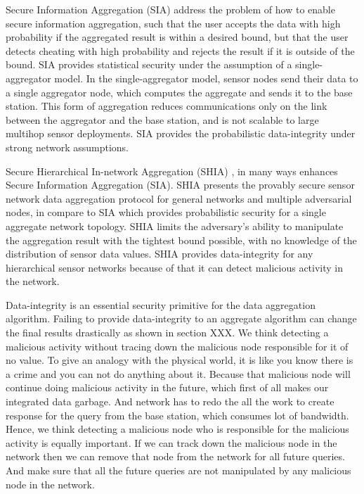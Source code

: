 	Secure Information Aggregation (SIA) \cite{przydatek2003sia}  address the problem of how to enable secure information aggregation, such that the user accepts the data with high probability if the aggregated result is within a desired bound, but that the user detects cheating with high probability and rejects the result if it is outside of the bound.
	SIA provides statistical security under the assumption of a single-aggregator model.
	In the single-aggregator model, sensor nodes send their data to a single
	aggregator node, which computes the aggregate and sends it to the
	base station.
	This form of aggregation reduces communications only on the link between the aggregator and the base station, and is not scalable to large multihop sensor deployments.
	SIA provides the probabilistic data-integrity under strong network assumptions.

	Secure Hierarchical In-network Aggregation (SHIA) \cite{chan2006secure}, in many ways enhances Secure Information Aggregation (SIA).
	SHIA presents the provably secure sensor network data aggregation protocol for general networks and multiple adversarial nodes, in compare to SIA which provides probabilistic security for a single aggregate network topology.
	SHIA limits the adversary’s ability to manipulate the aggregation result with the tightest bound possible, with no knowledge of the distribution of sensor data values.
	SHIA provides data-integrity for any hierarchical sensor networks because of that it can detect malicious activity in the network.

	Data-integrity is an essential security primitive for the data aggregation algorithm.
	Failing to provide data-integrity to an aggregate algorithm can change the final results drastically as shown in section XXX.
	We think detecting a malicious activity without tracing down the malicious node responsible for it of no value.
	To give an analogy with the physical world, it is like you know there is a crime and you can not do anything about it.
	Because that malicious node will continue doing malicious activity in the future, which first of all makes our integrated data garbage. 
	And network has to redo the all the work to create response for the query from the base station, which consumes lot of bandwidth. 
	Hence, we think detecting a malicious node who is responsible for the malicious activity is equally important.
	If we can track down the malicious node in the network then we can remove that node from the network for all future queries.
	And make sure that all the future queries are not manipulated by any malicious node in the network.
	
